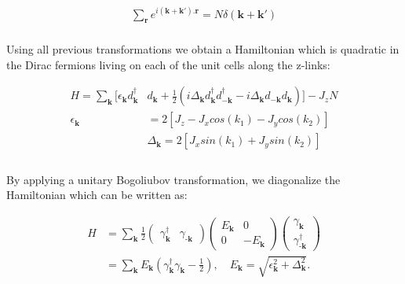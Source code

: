 \documentclass{article}
\begin{document}
\begin{equation}\label{eq:15}
	\begin{aligned}
		\sum_\textbf{r} e^{i(\textbf{k}+\textbf{k}').\textbf{r}} = N\delta(\textbf{k} + \textbf{k}')
	\end{aligned}
\end{equation}\\

Using all previous transformations we obtain a Hamiltonian which is quadratic in the Dirac fermions living on each of the unit cells along the z-links:

\begin{equation}\label{eq:16}
	\begin{aligned}
		H = \sum_\textbf{k}[\epsilon_\textbf{k}d^\dagger_{\textbf{k}}&d_{\textbf{k}} + \frac{1}{2}(i\Delta_\textbf{k}d^\dagger_{\textbf{k}}d^\dagger_{-\textbf{k}}-i\Delta_\textbf{k}d_{-\textbf{k}}d_{\textbf{k}})]-J_zN\\
		\epsilon_\textbf{k} &= 2[J_z-J_xcos(k_1)-J_ycos(k_2)]\\
		&\Delta_\textbf{k} = 2[J_xsin(k_1)+J_ysin(k_2)]\\
	\end{aligned}
\end{equation}\\

\noindent By applying a unitary Bogoliubov transformation, we diagonalize the Hamiltonian which can be written as:

\begin{equation}\label{eq:17}
	\begin{aligned}
		H &= \sum_\textbf{k} \frac{1}{2} 
		\begin{pmatrix}
			\gamma^\dagger_\textbf{k} & \gamma_{\textbf{-k}}
		\end{pmatrix}
		\begin{pmatrix}
			E_\textbf{k} & 0\\
			0 & -E_\textbf{k}
		\end{pmatrix}
		\begin{pmatrix} \gamma_\textbf{k} \\ \gamma^\dagger_{\textbf{-k}} \end{pmatrix}\\
		&= \sum_\textbf{k}E_\textbf{k}(\gamma^\dagger_\textbf{k}\gamma_{\textbf{k}}-\frac{1}{2}), \quad E_{\mathbf{k}} = \sqrt{\epsilon_{\mathbf{k}}^2 + \Delta_{\mathbf{k}}^2}. 
	\end{aligned}
\end{equation}\\
\end{document}
